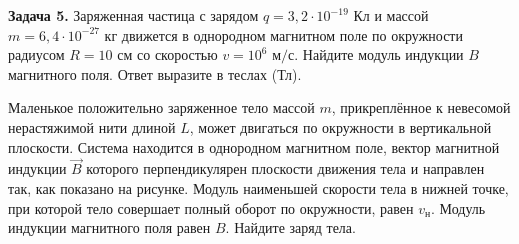 \begin{taskbasic}[code={\label{task:elem_mag_v25_n23}}]
\textbf{Задача 5.} Заряженная частица с зарядом $q = 3{,}2\cdot 10^{-19}\text{ Кл}$ и массой $m = 6{,}4\cdot 10^{-27}\text{ кг}$ движется в однородном магнитном поле по окружности радиусом $R = 10\text{ см}$ со скоростью $v = 10^6\text{ м/с}$. Найдите модуль индукции $B$ магнитного поля. Ответ выразите в теслах (Тл).

\end{taskbasic}

\begin{taskbasic}[code={\label{task:elem_mag_charge_vertical_circle}}]
Маленькое положительно заряженное тело массой $m$, прикреплённое к невесомой нерастяжимой нити длиной $L$, может двигаться по окружности в вертикальной плоскости. Система находится в однородном магнитном поле, вектор магнитной индукции $\vec{B}$ которого перпендикулярен плоскости движения тела и направлен так, как показано на рисунке. Модуль наименьшей скорости тела в нижней точке, при которой тело совершает полный оборот по окружности, равен $v_{\text{н}}$. Модуль индукции магнитного поля равен $B$. Найдите заряд тела.

\nopagebreak\smallskip
\begin{center}
\end{center}

\end{taskbasic}

